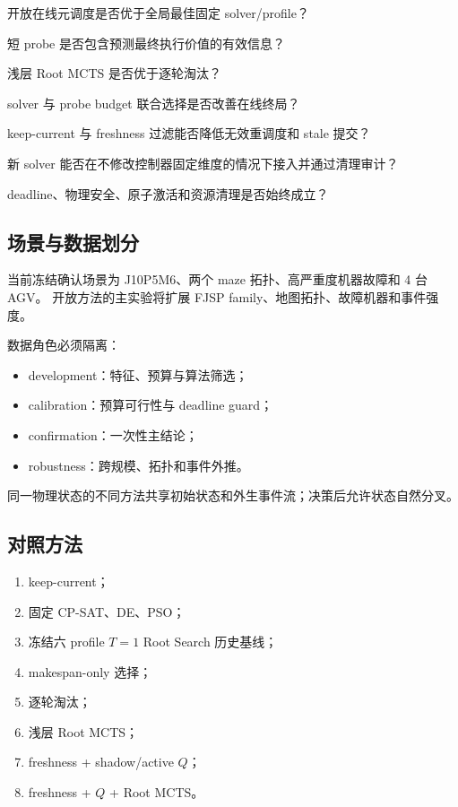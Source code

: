 \documentclass[11pt,a4paper]{article}
\begin{document}
\begin{description}[leftmargin=13mm,style=nextline]
    \item[RQ1] 开放在线元调度是否优于全局最佳固定 solver/profile？
    \item[RQ2] 短 probe 是否包含预测最终执行价值的有效信息？
    \item[RQ3] 浅层 Root MCTS 是否优于逐轮淘汰？
    \item[RQ4] solver 与 probe budget 联合选择是否改善在线终局？
    \item[RQ5] keep-current 与 freshness 过滤能否降低无效重调度和 stale 提交？
    \item[RQ6] 新 solver 能否在不修改控制器固定维度的情况下接入并通过清理审计？
    \item[RQ7] deadline、物理安全、原子激活和资源清理是否始终成立？
\end{description}

\subsection{场景与数据划分}

当前冻结确认场景为 J10P5M6、两个 maze 拓扑、高严重度机器故障和 4 台 AGV。
开放方法的主实验将扩展 FJSP family、地图拓扑、故障机器和事件强度。

数据角色必须隔离：
\begin{itemize}
    \item development：特征、预算与算法筛选；
    \item calibration：预算可行性与 deadline guard；
    \item confirmation：一次性主结论；
    \item robustness：跨规模、拓扑和事件外推。
\end{itemize}
同一物理状态的不同方法共享初始状态和外生事件流；决策后允许状态自然分叉。

\subsection{对照方法}

\begin{enumerate}
    \item keep-current；
    \item 固定 CP-SAT、DE、PSO；
    \item 冻结六 profile \(T=1\) Root Search 历史基线；
    \item makespan-only 选择；
    \item 逐轮淘汰；
    \item 浅层 Root MCTS；
    \item freshness + shadow/active \(Q\)；
    \item freshness + \(Q\) + Root MCTS。
\end{enumerate}
\end{document}
